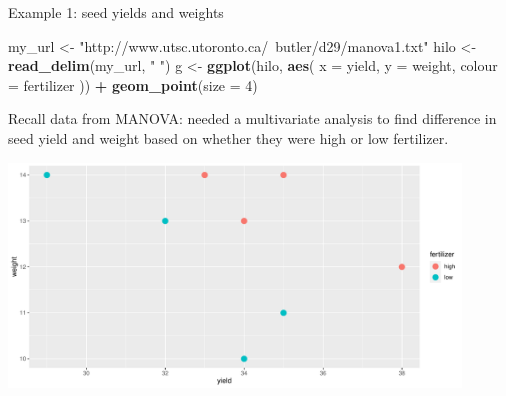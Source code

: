 \documentclass[
  ignorenonframetext,
]{beamer}
\newenvironment{Shaded}{\begin{snugshade}}{\end{snugshade}}
\newcommand{\DataTypeTok}[1]{\textcolor[rgb]{0.13,0.29,0.53}{#1}}
\newcommand{\DecValTok}[1]{\textcolor[rgb]{0.00,0.00,0.81}{#1}}
\newcommand{\KeywordTok}[1]{\textcolor[rgb]{0.13,0.29,0.53}{\textbf{#1}}}
\newcommand{\NormalTok}[1]{#1}
\newcommand{\OperatorTok}[1]{\textcolor[rgb]{0.81,0.36,0.00}{\textbf{#1}}}
\newcommand{\StringTok}[1]{\textcolor[rgb]{0.31,0.60,0.02}{#1}}
\begin{document}
\begin{frame}[fragile]{Example 1: seed yields and weights}
\protect\hypertarget{example-1-seed-yields-and-weights}{}

\small

\begin{Shaded}
\begin{Highlighting}[]
\NormalTok{my_url <-}\StringTok{ "http://www.utsc.utoronto.ca/~butler/d29/manova1.txt"}
\NormalTok{hilo <-}\StringTok{ }\KeywordTok{read_delim}\NormalTok{(my_url, }\StringTok{" "}\NormalTok{)}
\NormalTok{g <-}\StringTok{ }\KeywordTok{ggplot}\NormalTok{(hilo, }\KeywordTok{aes}\NormalTok{(}
  \DataTypeTok{x =}\NormalTok{ yield, }\DataTypeTok{y =}\NormalTok{ weight,}
  \DataTypeTok{colour =}\NormalTok{ fertilizer}
\NormalTok{)) }\OperatorTok{+}\StringTok{ }\KeywordTok{geom_point}\NormalTok{(}\DataTypeTok{size =} \DecValTok{4}\NormalTok{)}
\end{Highlighting}
\end{Shaded}

\normalsize

\begin{minipage}[t]{0.38\linewidth}
\vspace{0.1\textheight}
Recall data from MANOVA: needed a multivariate analysis to find
difference in seed yield and weight based on whether they were high
or low fertilizer.
\end{minipage}\hfill
\begin{minipage}[t][][b]{0.55\textwidth}
\includegraphics[width=0.9\textwidth]{berzani}
\end{minipage}

\end{frame}
\end{document}
